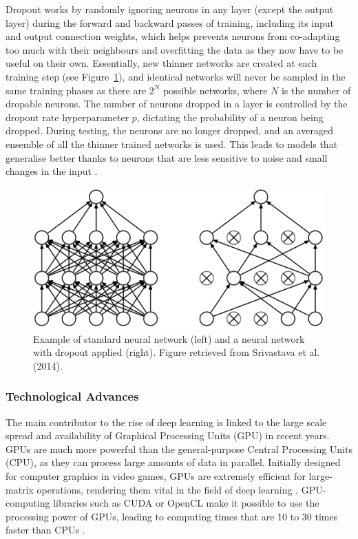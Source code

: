 Dropout works by randomly ignoring neurons in any layer (except the output layer) during the forward and backward passes of training, including its input and output connection weights, which helps prevents neurons from co-adapting too much with their neighbours and overfitting the data as they now have to be useful on their own. Essentially, new thinner networks are created at each training step (see Figure~\ref{fig:litsurvey-dropout}), and identical networks will never be sampled in the same training phases as there are $2^N$ possible networks, where $N$ is the number of dropable neurons. The number of neurons dropped in a layer is controlled by the dropout rate hyperparameter $p$, dictating the probability of a neuron being dropped. During testing, the neurons are no longer dropped, and an averaged ensemble of all the thinner trained networks is used. This leads to models that generalise better thanks to neurons that are less sensitive to noise and small changes in the input \citep{Srivastava2014}.

\begin{figure}[ht]
\centerline{\includegraphics[width=\textwidth]{figures/litsurvey/dropout.png}}
\caption{\label{fig:litsurvey-dropout}Example of standard neural network (left) and a neural network with dropout applied (right). Figure retrieved from Srivastava et al. (2014).}
\end{figure}

\subsubsection{Technological Advances}

The main contributor to the rise of deep learning is linked to the large scale spread and availability of  Graphical Processing Units (GPU) in recent years. GPUs are much more powerful than the general-purpose Central Processing Units (CPU), as they can process large amounts of data in parallel. Initially designed for computer graphics in video games, GPUs are extremely efficient for large-matrix operations, rendering them vital in the field of deep learning \citep{Caulfield2009}. GPU-computing libraries such as CUDA or OpenCL make it possible to use the processing power of GPUs, leading to computing times that are 10 to 30 times faster than CPUs \citep{Litjens2017}.\\

